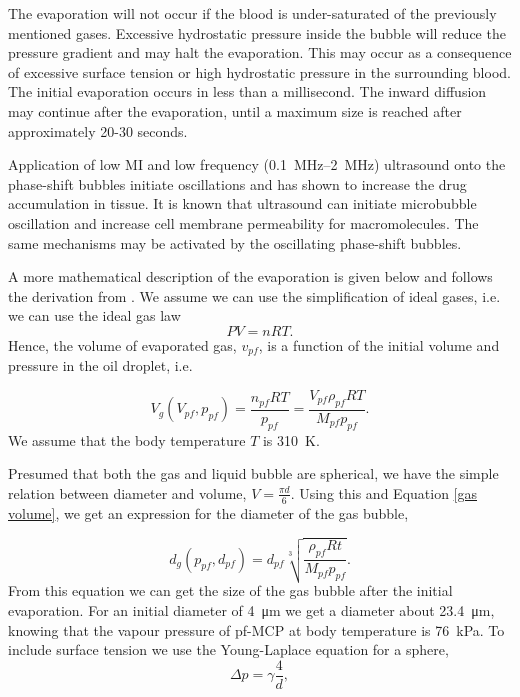 The evaporation will not occur if the blood is under-saturated of the previously mentioned gases. Excessive hydrostatic pressure inside the bubble will reduce the pressure gradient and may halt the evaporation. This may occur as a consequence of excessive surface tension or high hydrostatic pressure in the surrounding blood. The initial evaporation occurs in less than a millisecond. The inward diffusion may continue after the evaporation, until a maximum size is reached after approximately 20-30 seconds\cite{Healey_pc}.


Application of low MI and low frequency (\SIrange{0.1}{2}{\mega\hertz}) ultrasound onto the phase-shift bubbles initiate oscillations and has shown to increase the drug accumulation in tissue\cite{wamel2014}. It is known that ultrasound can initiate microbubble oscillation and increase cell membrane permeability for macromolecules\cite{VanWamel2006a}. The same mechanisms may be activated by the oscillating phase-shift bubbles.

A more mathematical description of the evaporation is given below and follows the derivation from \citet{Healey2013}. We assume we can use the simplification of  ideal gases, i.e. we can use the ideal gas law
\begin{equation}
\label{ideal gas law}
 PV = nRT. 
\end{equation}  
Hence, the volume of evaporated gas, $v_{pf}$, is a function of the initial volume and pressure in the oil droplet, i.e.

\begin{equation}
\label{gas volume}
V_g(V_{pf}, p_{pf}) = \frac{n_{pf}RT}{p_{pf}}=\frac{V_{pf}\rho_{pf}RT}{M_{pf}p_{pf}}.
\end{equation}
We assume that the body temperature $T$ is \SI{310}{\kelvin}. 

Presumed that both the gas and liquid bubble are spherical, we have the simple relation between diameter and volume, $V = \frac{\pi d}{6}$. Using this and Equation \eqref{gas volume}, we get an expression for the diameter of the gas bubble, 

\begin{equation}
\label{diameter}
d_g(p_{pf}, d_{pf}) = d_{pf}\sqrt[3]{\frac{\rho_{pf}Rt}{M_{pf}p_{pf}}}.
\end{equation}
From this equation we can get the size of the gas bubble after the initial evaporation. For an initial diameter of \SI{4}{\micro\metre} we get a diameter about \SI{23.4}{\micro\metre}, knowing that the vapour pressure of pf-MCP at body temperature is \SI{76}{\kilo\pascal}\cite{Healey2013}.
To include surface tension we use the Young-Laplace equation for a sphere,
\begin{equation}
\label{Young-Laplace}
\Delta p = \gamma\frac{4}{d},
\end{equation}


